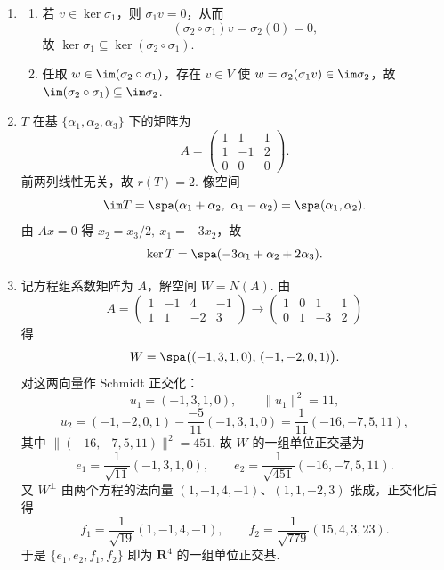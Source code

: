 \begin{enumerate}
    \item
    \begin{enumerate}
        \item 若 $v\in\ker\sigma_1$，则 $\sigma_1v=0$，从而
        \[
            (\sigma_2\circ\sigma_1)v=\sigma_2(0)=0,
        \]
        故 $\ker\sigma_1\subseteq\ker(\sigma_2\circ\sigma_1)$.

        \item 任取 $w\in\im(\sigma_2\circ\sigma_1)$，存在 $v\in V$ 使 $w=\sigma_2(\sigma_1v)\in\im\sigma_2$，故 $\im(\sigma_2\circ\sigma_1)\subseteq\im\sigma_2$.
    \end{enumerate}

    \item $T$ 在基 $\{\alpha_1,\alpha_2,\alpha_3\}$ 下的矩阵为
    \[
        A=\begin{pmatrix}
            1&1&1\\
            1&-1&2\\
            0&0&0
        \end{pmatrix}.
    \]
    前两列线性无关，故 $r(T)=2$. 像空间
    \[
        \im T=\spa(\alpha_1+\alpha_2,\ \alpha_1-\alpha_2)=\spa(\alpha_1,\alpha_2).
    \]
    由 $Ax=0$ 得 $x_2=x_3/2,\ x_1=-3x_2$，故
    \[
        \ker T=\spa(-3\alpha_1+\alpha_2+2\alpha_3).
    \]

    \item 记方程组系数矩阵为 $A$，解空间 $W=N(A)$. 由
    \[
        A=\begin{pmatrix}
            1&-1&4&-1\\
            1&1&-2&3
        \end{pmatrix}\longrightarrow
        \begin{pmatrix}
            1&0&1&1\\
            0&1&-3&2
        \end{pmatrix}
    \]
    得
    \[
        W=\spa\big((-1,3,1,0),\,(-1,-2,0,1)\big).
    \]
    对这两向量作 Schmidt 正交化：
    \[
        u_1=(-1,3,1,0),\qquad \|u_1\|^2=11,
    \]
    \[
        u_2=(-1,-2,0,1)-\frac{-5}{11}(-1,3,1,0)
        =\frac{1}{11}(-16,-7,5,11),
    \]
    其中 $\|(-16,-7,5,11)\|^2=451$. 故 $W$ 的一组单位正交基为
    \[
        e_1=\frac{1}{\sqrt{11}}(-1,3,1,0),\qquad
        e_2=\frac{1}{\sqrt{451}}(-16,-7,5,11).
    \]
    又 $W^{\perp}$ 由两个方程的法向量 $(1,-1,4,-1)$、$(1,1,-2,3)$ 张成，正交化后得
    \[
        f_1=\frac{1}{\sqrt{19}}(1,-1,4,-1),\qquad
        f_2=\frac{1}{\sqrt{779}}(15,4,3,23).
    \]
    于是 $\{e_1,e_2,f_1,f_2\}$ 即为 $\mathbf{R}^4$ 的一组单位正交基.


\end{enumerate}
